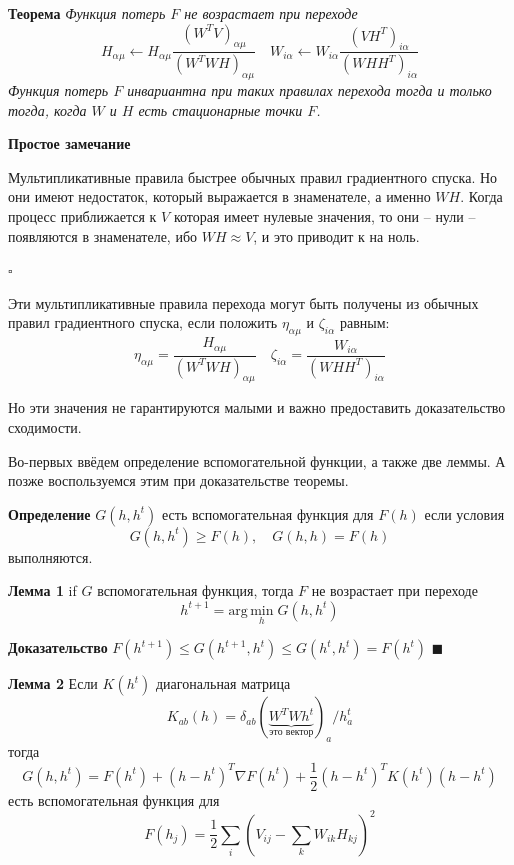\documentclass[oneside, final, 12pt]{extarticle}
\begin{document}
\textbf{Теорема} \textit{ Функция потерь $F$ не возрастает
при переходе
\[
  H_{\alpha\mu} \leftarrow H_{\alpha\mu}
  \frac{(W^TV)_{\alpha\mu}}{(W^TWH)_{\alpha\mu}} \quad
  W_{i\alpha} \leftarrow W_{i\alpha}
  \frac{(VH^T)_{i\alpha}}{(WHH^T)_{i\alpha}}
\]
Функция потерь $F$ инвариантна при таких правилах перехода тогда
и только тогда, когда $W$ и $H$ есть стационарные точки $F$.
}

\textbf{Простое замечание}

Мультипликативные правила быстрее обычных правил градиентного
спуска. Но они имеют недостаток, который выражается в знаменателе,
а именно $WH$. Когда процесс приближается к $V$ которая имеет нулевые
значения, то они -- нули -- появляются в знаменателе, ибо
$WH \approx V$, и это приводит
к { на ноль}.

$\square$

Эти мультипликативные правила перехода могут быть получены из
обычных правил градиентного спуска, если положить
$\eta_{\alpha\mu}$ и $\zeta_{i\alpha}$ равным:
\[
  \eta_{\alpha\mu} =
  \frac {H_{\alpha\mu}}
        {(W^TWH)_{\alpha\mu}} \quad
  \zeta_{i\alpha} =
  \frac {W_{i\alpha}}
        {(WHH^T)_{i\alpha}}
\]

Но эти значения не гарантируются малыми и важно предоставить
доказательство сходимости.

Во-первых ввёдем определение вспомогательной функции, а также две леммы.
А позже воспользуемся этим при доказательстве теоремы.

\textbf{Определение} $G(h,h^t)$ есть вспомогательная функция для $F(h)$
если условия
\[
  G(h,h^t) \geqslant F(h), \quad G(h,h) = F(h)
\]
выполняются.

\textbf{Лемма 1} if $G$ вспомогательная функция,
тогда $F$ не возрастает при переходе
\[
  h^{t+1} = \text{arg} \, \underset{h}{\text{min}} \; G(h,h^t)
\]

\textbf{Доказательство}
$F(h^{t+1}) \leqslant G(h^{t+1},h^t) \leqslant G(h^t,h^t) = F(h^t)$
$\blacksquare$

\textbf{Лемма 2} Если $K(h^t)$ диагональная матрица
\[
  K_{ab}(h) =
  \delta_{ab}
  (\underbrace{W^T W h^t}
    _{\text{это вектор}}
  )_a / h_a^t
\]
тогда
\begin{equation}\label{E:auxghht}
  G(h,h^t) = F(h^t) + (h - h^t)^T \nabla F(h^t)
    + \frac{1}{2} (h - h^t)^T K(h^t) (h - h^t)
\end{equation}
есть вспомогательная функция для
\[
  F(h_j) = \frac{1}{2} \sum_{i}
  \left(
    V_{ij} - \sum_{k}W_{ik}H_{kj}
  \right)^2
\]
\end{document}

